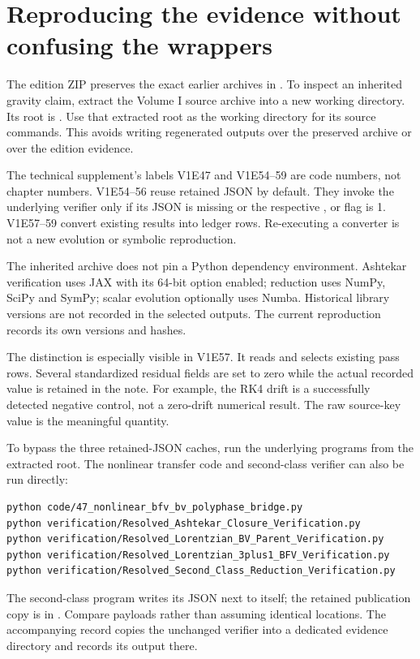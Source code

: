 \clearpage
\section{Reproducing the evidence without confusing the wrappers}\label{c:verify:reproduce}

The edition ZIP preserves the exact earlier archives in . To inspect an inherited gravity claim, extract the Volume I source archive into a new working directory. Its root is . Use that extracted root as the working directory for its source commands. This avoids writing regenerated outputs over the preserved archive or over the edition evidence.

The technical supplement's labels V1E47 and V1E54--59 are code numbers, not chapter numbers. V1E54--56 reuse retained JSON by default. They invoke the underlying verifier only if its JSON is missing or the respective ,  or  flag is 1. V1E57--59 convert existing results into ledger rows. Re-executing a converter is not a new evolution or symbolic reproduction.

The inherited archive does not pin a Python dependency environment. Ashtekar verification uses JAX with its 64-bit option enabled; reduction uses NumPy, SciPy and SymPy; scalar evolution optionally uses Numba. Historical library versions are not recorded in the selected outputs. The current reproduction records its own versions and hashes.

The distinction is especially visible in V1E57. It reads  and selects existing pass rows. Several standardized residual fields are set to zero while the actual recorded value is retained in the note. For example, the RK4 drift is a successfully detected negative control, not a zero-drift numerical result. The raw source-key value is the meaningful quantity.

To bypass the three retained-JSON caches, run the underlying programs from the extracted root. The nonlinear transfer code and second-class verifier can also be run directly:
\begin{lstlisting}
python code/47_nonlinear_bfv_bv_polyphase_bridge.py
python verification/Resolved_Ashtekar_Closure_Verification.py
python verification/Resolved_Lorentzian_BV_Parent_Verification.py
python verification/Resolved_Lorentzian_3plus1_BFV_Verification.py
python verification/Resolved_Second_Class_Reduction_Verification.py
\end{lstlisting}
The second-class program writes its JSON next to itself; the retained publication copy is in . Compare payloads rather than assuming identical locations. The accompanying record copies the unchanged verifier into a dedicated evidence directory and records its output there.

